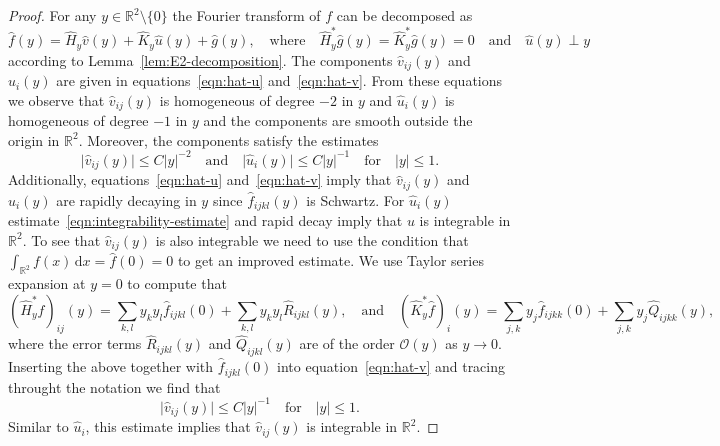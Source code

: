 \documentclass[11pt]{article}
\newcommand{\abs}[1]{\lvert #1 \rvert}
\renewcommand{\d}{\mathrm{d}}
\begin{document}
\begin{proof}
For any $y \in \mathbb{R}^2 \setminus \{0\}$ the Fourier transform of $f$ can be decomposed as
\begin{equation}
\widehat f(y)
=
\widehat{H}_y\widehat v(y)
+
\widehat{K}_y\widehat u(y)
+
\widehat g(y),
\quad\text{where}\quad
\widehat{H}_y^*\widehat g(y)
=
\widehat{K}_y^*\widehat g(y)
=
0
\quad\text{and}\quad
\widehat u(y) \perp y
\end{equation}
according to Lemma~\ref{lem:E2-decomposition}. The components $\widehat v_{ij}(y)$ and $\widehat u_i(y)$ are given in equations~\eqref{eqn:hat-u} and~\eqref{eqn:hat-v}. From these equations we observe that $\widehat v_{ij}(y)$ is homogeneous of degree $-2$ in $y$ and $\widehat u_i(y)$ is homogeneous of degree $-1$ in $y$ and the components are smooth outside the origin in $\mathbb{R}^2$. Moreover, the components satisfy the estimates
\begin{equation}
\label{eqn:integrability-estimate}
\abs{\widehat v_{ij}(y)}
\leq
C\abs{y}^{-2}
\quad\text{and}\quad
\abs{\widehat u_{i}(y)}
\leq
C\abs{y}^{-1}
\quad\text{for}\quad
\abs{y} \leq 1.
\end{equation}
Additionally, equations~\eqref{eqn:hat-u} and~\eqref{eqn:hat-v} imply that $\widehat v_{ij}(y)$ and $\widehat u_i(y)$ are rapidly decaying in $y$ since $\widehat f_{ijkl}(y)$ is Schwartz. For $\widehat u_i(y)$ estimate~\eqref{eqn:integrability-estimate} and rapid decay imply that $u$ is integrable in $\mathbb{R}^2$. To see that $\widehat v_{ij}(y)$ is also integrable we need to use the condition that $\int_{\mathbb{R}^2} f(x)\,\d x = \widehat f(0) = 0$ to get an improved estimate. We use Taylor series expansion at $y = 0$ to compute that
\begin{equation}
(\widehat{H}^*_y\widehat f)_{ij}(y)
=
\sum_{k,l}
y_ky_l\widehat f_{ijkl}(0)
+
\sum_{k,l}
y_ky_l\widehat R_{ijkl}(y), \quad \mbox{and}\quad(\widehat{K}^*_y\widehat f)_{i}(y)
=
\sum_{j,k}
y_j\widehat f_{ijkk}(0)
+
\sum_{j,k}
y_j\widehat Q_{ijkk}(y),
\end{equation}
where the error terms $\widehat R_{ijkl}(y)$ and $\widehat Q_{ijkl}(y)$ are of the order $\mathcal{O}(y)$ as $y \to 0$. Inserting the above together with $\widehat f_{ijkl}(0)$ into equation~\eqref{eqn:hat-v} and tracing throught the notation we find that
\begin{equation}
\abs{\widehat v_{ij}(y)}
\leq
C\abs{y}^{-1}
\quad\text{for}\quad
\abs{y} \leq 1.
\end{equation}
Similar to $\widehat u_i$, this estimate implies that $\widehat v_{ij}(y)$ is integrable in $\mathbb{R}^2$.


\end{proof}
\end{document}

